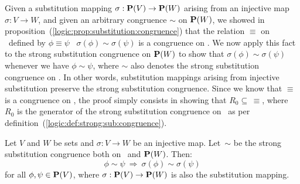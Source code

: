 Given a substitution mapping $\sigma:\mbox{${\bf P}(V)$}\to{\bf P}(W)$ arising from
an injective map $\sigma:V\to W$, and given an arbitrary congruence
$\sim$ on ${\bf P}(W)$, we showed in
proposition~(\ref{logic:prop:substitution:congruence}) that the
relation $\equiv$ on \pv\ defined by $\phi\equiv\psi$ \ifand\
$\sigma(\phi)\sim\sigma(\psi)$ is a congruence on \pv. We now apply
this fact to the strong substitution congruence on ${\bf P}(W)$ to
show that $\sigma(\phi)\sim\sigma(\psi)$ whenever we have
$\phi\sim\psi$, where $\sim$ also denotes the strong substitution
congruence on \pv. In other words, substitution mappings arising
from injective substitution preserve the strong substitution
congruence. Since we know that $\equiv$ is a congruence on \pv, the
proof simply consists in showing that $R_{0}\subseteq\,\equiv$,
where $R_{0}$ is the generator of the strong substitution congruence
on \pv\ as per definition~(\ref{logic:def:strong:sub:congruence}).
\begin{prop}\label{logic:prop:strong:injective:substitution}
Let $V$ and $W$ be sets and $\sigma:V\to W$ be an injective map.
Let~$\sim$ be the strong substitution congruence both on \pv\ and
${\bf P}(W)$. Then:
    \[
    \phi\sim\psi\ \Rightarrow\ \sigma(\phi)\sim\sigma(\psi)
    \]
for all $\phi,\psi\in\mbox{${\bf P}(V)$}$, where $\sigma:\mbox{${\bf P}(V)$}\to{\bf P}(W)$ is also
the substitution mapping.
\end{prop}
